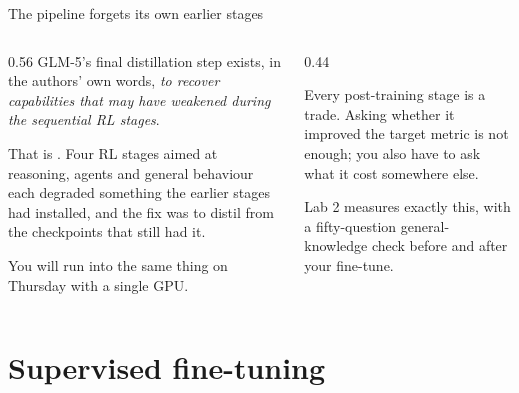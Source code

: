 \documentclass[aspectratio=169,10pt]{beamer}
\begin{document}
\begin{frame}{The pipeline forgets its own earlier stages}
  \begin{columns}[T]
    \begin{column}{0.56\textwidth}
      GLM-5's final distillation step exists, in the authors' own words,
      \emph{to recover capabilities that may have weakened during the
      sequential RL stages}.
      \vspace{0.6em}

      That is . Four RL stages aimed at reasoning, agents and general behaviour
      each degraded something the earlier stages had installed, and the fix was
      to distil from the checkpoints that still had it.
      \vspace{0.6em}

      You will run into the same thing on Thursday with a single GPU.
    \end{column}
    \begin{column}{0.44\textwidth}
      \begin{takeaway}
        \small
        Every post-training stage is a trade. Asking whether it improved the
        target metric is not enough; you also have to ask what it cost
        somewhere else.
        \vspace{0.4em}

        Lab 2 measures exactly this, with a fifty-question general-knowledge
        check before and after your fine-tune.
      \end{takeaway}
    \end{column}
  \end{columns}
\end{frame}

\section{Supervised fine-tuning}
\end{document}
